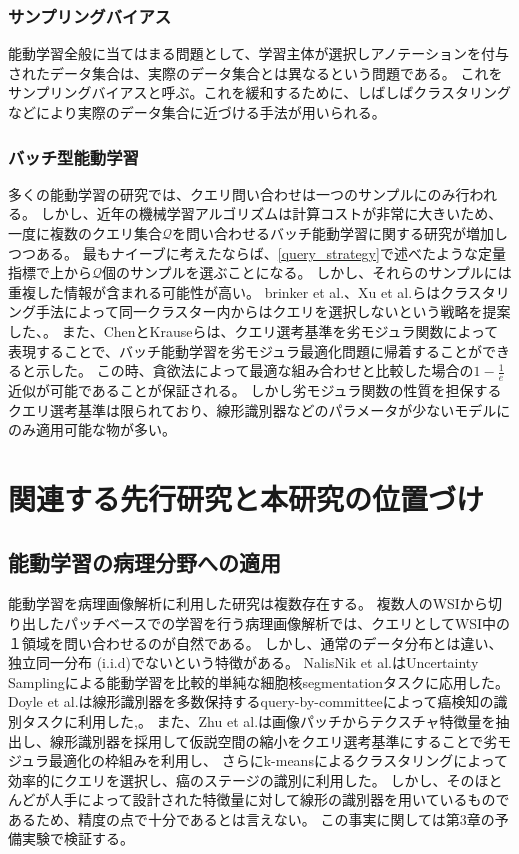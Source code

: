 \subsubsection{サンプリングバイアス}
能動学習全般に当てはまる問題として、学習主体が選択しアノテーションを付与されたデータ集合は、実際のデータ集合とは異なるという問題である。
これをサンプリングバイアスと呼ぶ。これを緩和するために、しばしばクラスタリングなどにより実際のデータ集合に近づける手法が用いられる。

\subsubsection{バッチ型能動学習}
多くの能動学習の研究では、クエリ問い合わせは一つのサンプルにのみ行われる。
しかし、近年の機械学習アルゴリズムは計算コストが非常に大きいため、一度に複数のクエリ集合$\mathcal{Q}$を問い合わせるバッチ能動学習に関する研究が増加しつつある。
最もナイーブに考えたならば、\ref{query_strategy}で述べたような定量指標で上から$\mathcal{Q}$個のサンプルを選ぶことになる。
しかし、それらのサンプルには重複した情報が含まれる可能性が高い。
brinker et al.、Xu et al.らはクラスタリング手法によって同一クラスター内からはクエリを選択しないという戦略を提案した\cite{brinker2003incorporating}、\cite{Xu2007}。
また、ChenとKrauseらは、クエリ選考基準を劣モジュラ関数によって表現することで、バッチ能動学習を劣モジュラ最適化問題に帰着することができると示した\cite{chen2013near}。
この時、貪欲法によって最適な組み合わせと比較した場合の$1 - \frac{1}{e}$近似が可能であることが保証される。
しかし劣モジュラ関数の性質を担保するクエリ選考基準は限られており、線形識別器などのパラメータが少ないモデルにのみ適用可能な物が多い。

\section{関連する先行研究と本研究の位置づけ}

\subsection{能動学習の病理分野への適用}

能動学習を病理画像解析に利用した研究は複数存在する。
複数人のWSIから切り出したパッチベースでの学習を行う病理画像解析では、クエリとしてWSI中の１領域を問い合わせるのが自然である。
しかし、通常のデータ分布とは違い、独立同一分布 (i.i.d)でないという特徴がある。
NalisNik et al.はUncertainty Samplingによる能動学習を比較的単純な細胞核segmentationタスクに応用した\cite{nalisnik2017interactive}。
Doyle et al.は線形識別器を多数保持するquery-by-committeeによって癌検知の識別タスクに利用した\cite{doyle2011active},。
また、Zhu et al.は画像パッチからテクスチャ特徴量を抽出し、線形識別器を採用して仮説空間の縮小をクエリ選考基準にすることで劣モジュラ最適化の枠組みを利用し、
さらにk-meansによるクラスタリングによって効率的にクエリを選択し、癌のステージの識別に利用した\cite{zhu2014scalable}。
しかし、そのほとんどが人手によって設計された特徴量に対して線形の識別器を用いているものであるため、精度の点で十分であるとは言えない。
この事実に関しては第3章の予備実験で検証する。


